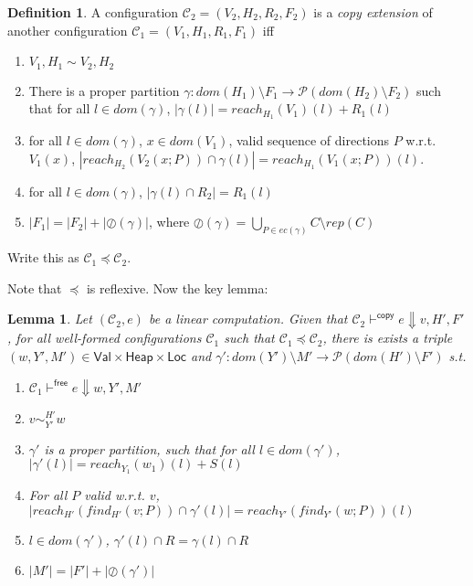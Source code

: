 \documentclass{easychair}
\newcommand{\ms}[1]{\ensuremath{\mathsf{#1}}}
\newcommand{\veq}[4]{#3 \sim^{#1}_{#2} #4}
\newcommand{\oh}[1]{\oslash(#1)}
\newtheorem{lemma}[theorem]{Lemma}
\theoremstyle{definition}
\newtheorem{definition}{Definition}
\begin{document}
\begin{definition}
A configuration $\mathcal{C}_2 = (V_2,H_2,R_2,F_2)$ is a \emph{copy extension} of another configuration
$\mathcal{C}_1 = (V_1,H_1,R_1,F_1)$ iff
\begin{enumerate}
\item $V_1,H_1 \sim V_2,H_2$
\item There is a proper partition $\gamma : dom(H_1) \setminus F_1 \to \mathcal{P}(dom(H_2) \setminus F_2)$ 
such that for all $l \in dom(\gamma)$, $|\gamma(l)| = reach_{H_1}(V_1)(l) + R_1(l)$
\item for all $l \in dom(\gamma)$, $x \in dom(V_1)$, valid sequence of directions $P$ w.r.t. $V_1(x)$,
	$|reach_{H_2}(V_2(x;P)) \cap \gamma(l)| = reach_{H_1}(V_1(x;P))(l)$.
\item for all $l \in dom(\gamma)$, $|\gamma(l) \cap R_2| = R_1(l)$
\item $|F_1| = |F_2| + |\oh{\gamma}|$, where 
	$\oh{\gamma} = \bigcup_{P \in ec(\gamma)} C \setminus rep(C)$
\end{enumerate}
Write this as $\mathcal{C}_1 \preceq \mathcal{C}_2$.
\end{definition} 

Note that $\preceq$ is reflexive. Now the key lemma:

\begin{lemma}
	Let $(\mathcal{C}_2,e)$ be a linear computation. Given that 
	$\mathcal{C}_2 \vdash^{\mathsf{copy}} e \Downarrow v,H',F'$, 
	for all well-formed configurations $\mathcal{C}_1$ such that $\mathcal{C}_1 \preceq \mathcal{C}_2$,
there is exists a triple
$(w,Y',M') \in \ms{Val} \times \ms{Heap} \times \ms{Loc}$ and 
	$\gamma' : dom(Y') \setminus M' \to \mathcal{P}(dom(H') \setminus F')$ s.t.
	\begin{enumerate}
			\item $\mathcal{C}_1 \vdash^{\mathsf{free}} e \Downarrow w,Y',M'$
			\item $\veq{H'}{Y'}{v}{w}$
			\item $\gamma'$ is a proper partition, such that for all $l \in dom(\gamma')$, 
				$|\gamma'(l)| = reach_{Y_1}(w_1)(l) + S(l)$
			\item For all $P$ valid w.r.t. $v$, $|reach_{H'}(find_{H'}(v;P)) \cap \gamma'(l)| = 
				reach_{Y'}(find_{Y'}(w;P))(l)$
			\item $l \in dom(\gamma')$, 
					$\gamma'(l) \cap R = \gamma(l) \cap R$ 
			\item $|M'| = |F'| + |\oh{\gamma'}|$
	\end{enumerate}
\end{lemma}
\end{document}
